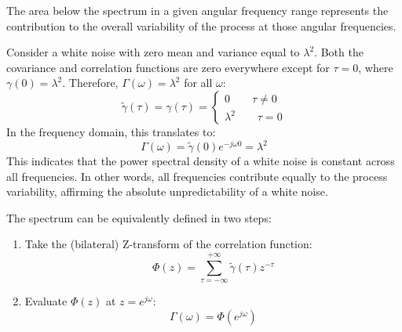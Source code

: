 The area below the spectrum in a given angular frequency range represents the contribution to the overall variability of the process at those angular frequencies.
\begin{example}
    Consider a white noise with zero mean and variance equal to $\lambda^2$. 
    Both the covariance and correlation functions are zero everywhere except for $\tau = 0$, where $\gamma(0) = \lambda^2$. 
    Therefore, $\Gamma(\omega)=\lambda^2$ for all $\omega$: 
    \[\tilde{\gamma}(\tau)=\gamma(\tau)=\begin{cases}
        0 \qquad \tau \neq 0 \\
        \lambda^2 \qquad \tau = 0
    \end{cases}\]
    In the frequency domain, this translates to:
    \[\Gamma(\omega)=\tilde{\gamma}(0)e^{-j\omega 0}=\lambda^2\]
    This indicates that the power spectral density of a white noise is constant across all frequencies. 
    In other words, all frequencies contribute equally to the process variability, affirming the absolute unpredictability of a white noise.
\end{example}
The spectrum can be equivalently defined in two steps:
\begin{enumerate}
    \item Take the (bilateral) Z-transform of the correlation function:
        \[\Phi(z)=\sum_{\tau=-\infty}^{+\infty}\tilde{\gamma}(\tau)z^{-\tau}\]
    \item Evaluate $\Phi(z)$ at $z=e^{j\omega}$: 
        \[\Gamma(\omega)=\Phi(e^{j\omega})\]
\end{enumerate}